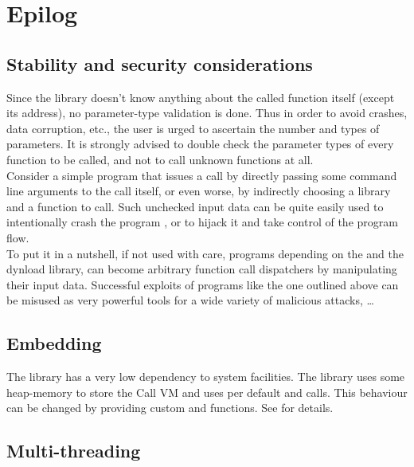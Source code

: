 \newpage

\section{Epilog}

\subsection{Stability and security considerations}

Since the  library doesn't know anything about the called function itself
(except its address), no parameter-type validation is done. Thus in order to avoid crashes, data corruption, etc., the user is urged to ascertain the number and types of parameters. 
It is strongly advised to double check the parameter types of every function to be called, and not to call unknown functions at all.\\

Consider a simple program that issues a call by directly passing some command line arguments to the call itself, or even worse, by indirectly choosing a library and a function to call. Such unchecked input data can be quite easily used to intentionally crash the program , or to hijack it and take control of the program flow.\\
To put it in a nutshell, if not used with care, programs depending on the 
and the dynload library, can become arbitrary function call dispatchers by
manipulating their input data. Successful exploits of programs like the one
outlined above can be misused as very powerful tools for a wide variety of
malicious attacks, \ldots
 

\subsection{Embedding}

The  library has a very low dependency to system facilities.
The library uses some heap-memory to store the Call VM and uses per default
 and  calls. This behaviour can be changed by 
providing custom  and  functions. See  for details.

\subsection{Multi-threading}

